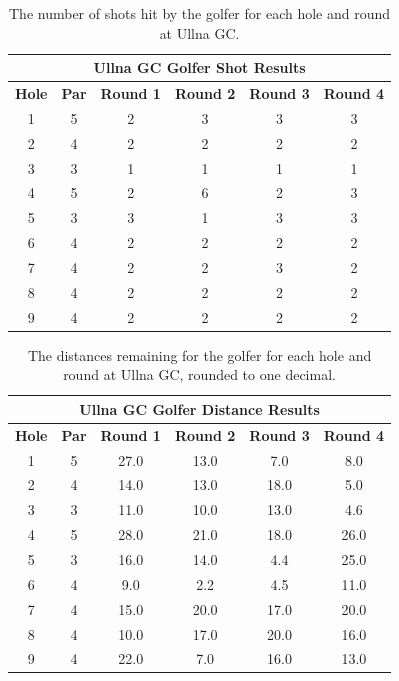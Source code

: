 \documentclass{kththesis}
\begin{document}
\begin{table}
    \centering
    \begin{tabular}{|c|c|c|c|c|c|} \hline
    \multicolumn{6}{|c|}{\textbf{Ullna GC Golfer Shot Results}} \\ \hline  
    \textbf{Hole} & \textbf{Par} & \textbf{Round 1} & \textbf{Round 2} & \textbf{Round 3} & \textbf{Round 4} \\ \hline
    1 & 5 & 2 & 3 & 3 & 3 \\ \hline
    2 & 4 & 2 & 2 & 2 & 2 \\ \hline
    3 & 3 & 1 & 1 & 1 & 1 \\ \hline
    4 & 5 & 2 & 6 & 2 & 3 \\ \hline
    5 & 3 & 3 & 1 & 3 & 3 \\ \hline
    6 & 4 & 2 & 2 & 2 & 2 \\ \hline
    7 & 4 & 2 & 2 & 3 & 2 \\ \hline
    8 & 4 & 2 & 2 & 2 & 2 \\ \hline
    9 & 4 & 2 & 2 & 2 & 2 \\ \hline
    \end{tabular}
    \caption{The number of shots hit by the golfer for each hole and round at Ullna GC.}
    \label{tab:L2_ullna_shot_results}
\end{table}

\begin{table}
    \centering
    \begin{tabular}{|c|c|c|c|c|c|} \hline
    \multicolumn{6}{|c|}{\textbf{Ullna GC Golfer Distance Results}} \\ \hline  
    \textbf{Hole} & \textbf{Par} & \textbf{Round 1} & \textbf{Round 2} & \textbf{Round 3} & \textbf{Round 4} \\ \hline
    1 & 5 & 27.0 & 13.0 & 7.0 & 8.0 \\ \hline
    2 & 4 & 14.0 & 13.0 & 18.0 & 5.0 \\ \hline
    3 & 3 & 11.0 & 10.0 & 13.0 & 4.6 \\ \hline
    4 & 5 & 28.0 & 21.0 & 18.0 & 26.0 \\ \hline
    5 & 3 & 16.0 & 14.0 & 4.4 & 25.0 \\ \hline
    6 & 4 & 9.0 & 2.2 & 4.5 & 11.0 \\ \hline
    7 & 4 & 15.0 & 20.0 & 17.0 & 20.0 \\ \hline
    8 & 4 & 10.0 & 17.0 & 20.0 & 16.0 \\ \hline
    9 & 4 & 22.0 & 7.0 & 16.0 & 13.0 \\ \hline
    \end{tabular}
    \caption{The distances remaining for the golfer for each hole and round at Ullna GC, rounded to one decimal.}
    \label{tab:L2_ullna_distance_results}
\end{table}
\end{document}
